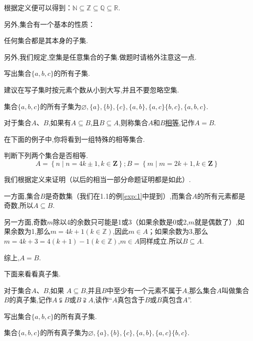 \documentclass[lang=cn,math=cm,chinesefont=nofont,11pt,scheme=chinese,twocol]{elegantbook}
\begin{document}
根据定义便可以得到：$\mathbb{N}\subseteq\mathbb{Z}\subseteq\mathbb{Q}\subseteq\mathbb{R}$.

  另外,集合有一个基本的性质：
\begin{property}
  任何集合都是其本身的子集.
\end{property}

另外,我们规定,空集是任意集合的子集.做题时请格外注意这一点.

\begin{example}
  写出集合$\{a,b,c\}$的所有子集.
\end{example}
\begin{remark}
  建议在写子集时按元素个数从小到大写,并且不要忽略空集.
\end{remark}
\begin{solution}
  集合$\{a,b,c\}$的所有子集为$\varnothing ,\{a\},\{b\},\{c\},\{a,b\},\{a,c\}\{b,c\},\{a,b,c\}$.
\end{solution}
\begin{definition}[集合的相等]
  对于集合$A$、$B$,如果有$A\subseteq B$,且$B\subseteq A$,则称集合$A$和$B$\underline{相等},记作$A=B$.
\end{definition}

在下面的例子中,你将看到一组特殊的相等集合.

\begin{example}\label{exp:2}
  判断下列两个集合是否相等.
  $$A=\left\{n\mid n=4k\pm1,k\in\mathbf{Z}\right\};B=\left\{m\mid m=2k+1,k\in\mathbf{Z}\right\}$$
\end{example}
\begin{solution}
  我们根据定义来证明（以后的相当一部分命题证明都是如此）.

一方面,集合$B$是奇数集（我们在1.1的例\ref{exp:1}中提到）,而集合$A$的所有元素都是奇数,所以$A\subseteq B$.

另一方面,奇数$m$除以4的余数只可能是1或3（如果余数是0或2,$m$就是偶数了）,如果余数为1,那么$m=4k+1(k\in\mathbb{Z})$,因此$m\in A$；如果余数为3,那么$m=4k+3=4(k+1)-1(k\in\mathbb{Z})$,$m\in A$同样成立.所以$B\subseteq A$.

综上,$A=B$.
\end{solution}

下面来看看真子集.
\begin{definition}[真子集]
  对于集合$A$、$B$,如果 $A\subseteq B$,并且$B$中至少有一个元素不属于$A$,那么集合$A$叫做集合$B$的真子集,记作$A\subsetneqq B$或$B\supsetneqq A$,读作“$A$真包含于$B$或$B$真包含$A$”.
\end{definition}

\begin{example}
  写出集合$\{a,b,c\}$的所有真子集.
\end{example}
\begin{solution}集合$\{a,b,c\}$的所有真子集为$\varnothing ,\{a\},\{b\},\{c\},\{a,b\},\{a,c\}\{b,c\}$.
\end{solution}
\end{document}

